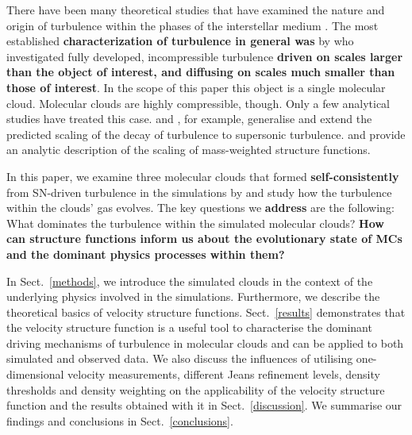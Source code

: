 There have been many theoretical studies that have examined the nature and origin of turbulence within the phases of the interstellar medium \citep[ISM;][and references within]{MacLow2004}. 
The most established \textbf{characterization of turbulence in general was} by \citet{Kolmogorov1941} who investigated fully developed, incompressible turbulence \textbf{driven on scales larger than the object of interest, and diffusing on scales much smaller than those of interest}.
In the scope of this paper this object is a single molecular cloud. 
    Molecular clouds are highly compressible, though.  Only a few analytical studies have treated this case.
\citet{She1994} and \citet{Boldyrev2002}, for example, generalise and extend the predicted scaling of the decay of turbulence to supersonic turbulence.
\citet{Galtier2011} and \citet{Banerjee2013} provide an analytic description of the scaling of mass-weighted structure functions.

In this paper, we examine three molecular clouds that formed \textbf{self-consistently} from SN-driven turbulence in the simulations by \citet[ and  hereafter]{IbanezMejia2016,IbanezMejia2017} and study how the turbulence within the clouds' gas evolves.
The key questions we \textbf{address} are the following: 
What dominates the turbulence within the simulated molecular clouds? 
\textbf{How can structure functions inform us about the evolutionary state of MCs and the dominant physics processes within them?}

In Sect.~\ref{methods}, we introduce the simulated clouds in the context of the underlying physics involved in the simulations.
Furthermore, we describe the theoretical basics of velocity structure functions.
Sect.~\ref{results} demonstrates that the velocity structure function is a useful tool to characterise the dominant driving mechanisms of turbulence in molecular clouds and can be applied to both simulated and observed data. 
We also discuss the influences of utilising one-dimensional velocity measurements, different Jeans refinement levels, density thresholds and density weighting on the applicability of the velocity structure function and the results obtained with it in Sect.~\ref{discussion}.  
We summarise our findings and conclusions in Sect.~\ref{conclusions}.



\endinput
